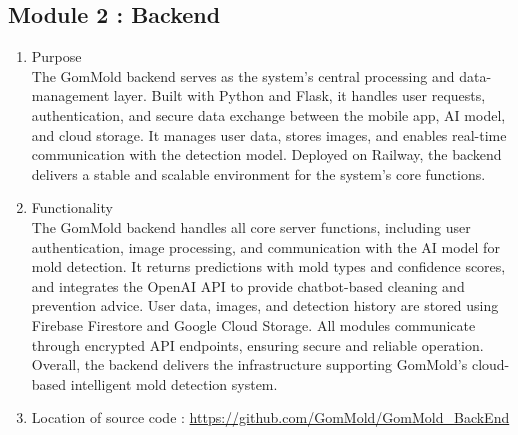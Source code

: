 \documentclass[conference]{IEEEtran}
\begin{document}
\subsection{Module 2 : Backend}
\begin{enumerate}
    \item[1)] Purpose\\
  The GomMold backend serves as the system’s central processing and data-management layer. Built with Python and Flask, it handles user requests, authentication, and secure data exchange between the mobile app, AI model, and cloud storage. It manages user data, stores images, and enables real-time communication with the detection model. Deployed on Railway, the backend delivers a stable and scalable environment for the system’s core functions.\\
    \item[2)] Functionality\\
   The GomMold backend handles all core server functions, including user authentication, image processing, and communication with the AI model for mold detection. It returns predictions with mold types and confidence scores, and integrates the OpenAI API to provide chatbot-based cleaning and prevention advice. User data, images, and detection history are stored using Firebase Firestore and Google Cloud Storage. All modules communicate through encrypted API endpoints, ensuring secure and reliable operation. Overall, the backend delivers the infrastructure supporting GomMold’s cloud-based intelligent mold detection system.\\
    \item[3)]Location of source code : \url{https://github.com/GomMold/GomMold_BackEnd}

\end{enumerate}
\end{document}
